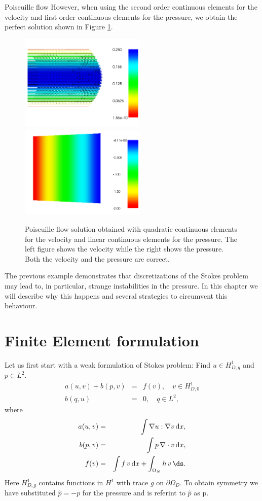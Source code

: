 \begin{example}{Poiseuille flow}
However, when using the second order continuous elements for the velocity and
first order continuous elements for the pressure, we obtain the perfect solution
shown in Figure \ref{fig:stokes2}.
\begin{figure}
\begin{center}
\includegraphics[width=6cm]{chapters/Stokes_problem/plots/stokes_velocity.png}
\includegraphics[width=6cm]{chapters/Stokes_problem/plots/stokes_pressure.png}
\caption{Poiseuille flow solution obtained with quadratic continuous elements for the
velocity and linear continuous elements for the pressure. The left figure shows the velocity while the right shows
the pressure. Both the velocity and the pressure are correct.}
\label{fig:stokes2}
\end{center}
\end{figure}
\end{example}

The previous example demonstrates that discretizations of the Stokes problem may lead
to, in particular, strange instabilities in the pressure. In this chapter we will describe why this
happens and several strategies to circumvent this behaviour.

\section{Finite Element formulation}

Let us first start with a weak formulation of Stokes problem:
Find $u\in H^1_{D,g}$ and $p\in L^2$.
\begin{eqnarray*}
a(u,v) + b(p,v) &=& f(v), \quad v\in H_{D,0}^1\\
b(q,u) &=& 0,\quad q\in L^2,
\end{eqnarray*}
where
\begin{eqnarray*}
a(u,v) &=& \int\nabla u : \nabla v \dx, \\
b(p,v) &=& \int p \, \nabla \cdot v \dx, \\
f(v) &=& \int f\, v \dx + \int_{\Omega_N} h \, v \, \ds  .
\end{eqnarray*}
Here
$H^1_{D,g}$ contains functions  in $H^1$ with trace $g$ on $\partial \Omega_D$.
To obtain symmetry we have substituted $\hat{p} = - p$ for the pressure
and is referint to $\hat{p}$ as p.

